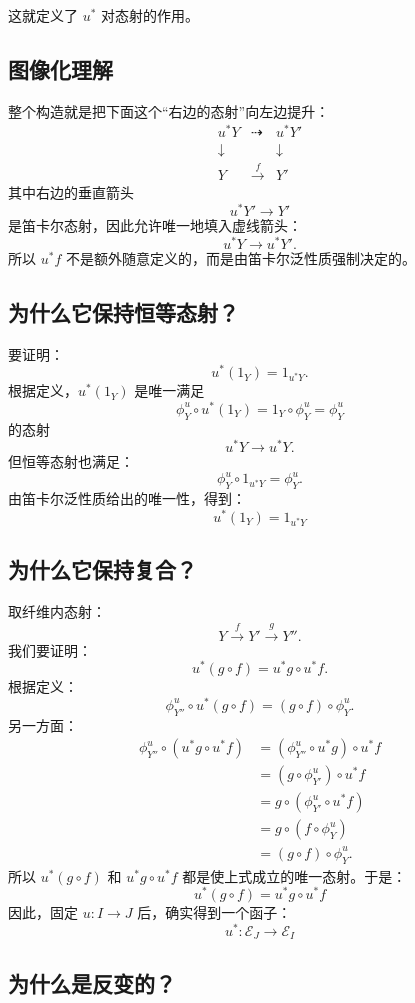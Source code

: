 \documentclass[12pt,a4paper]{article}
\begin{document}
这就定义了 \(u^*\) 对态射的作用。

\subsection{图像化理解}

整个构造就是把下面这个“右边的态射”向左边提升：
\[
\begin{array}{ccccc}
u^*Y & \dashrightarrow & u^*Y'\\
\downarrow && \downarrow\\
Y&\xrightarrow{f}&Y'
\end{array}
\]
其中右边的垂直箭头
\[
u^*Y'\to Y'
\]
是笛卡尔态射，因此允许唯一地填入虚线箭头：
\[
u^*Y\to u^*Y'.
\]
所以 \(u^*f\) 不是额外随意定义的，而是由笛卡尔泛性质强制决定的。

\subsection{为什么它保持恒等态射？}

要证明：
\[
u^*(1_Y)=1_{u^*Y}.
\]
根据定义，\(u^*(1_Y)\) 是唯一满足
\[
\phi_Y^u\circ u^*(1_Y)
=
1_Y\circ\phi_Y^u
=
\phi_Y^u
\]
的态射
\[
u^*Y\to u^*Y.
\]
但恒等态射也满足：
\[
\phi_Y^u\circ 1_{u^*Y}
=
\phi_Y^u.
\]
由笛卡尔泛性质给出的唯一性，得到：
\[
\boxed{
u^*(1_Y)=1_{u^*Y}
}
\]

\subsection{为什么它保持复合？}

取纤维内态射：
\[
Y\xrightarrow{f}Y'\xrightarrow{g}Y''.
\]
我们要证明：
\[
u^*(g\circ f)=u^*g\circ u^*f.
\]
根据定义：
\[
\phi_{Y''}^u\circ u^*(g\circ f)
=
(g\circ f)\circ\phi_Y^u.
\]
另一方面：
\begin{align*}
\phi_{Y''}^u\circ(u^*g\circ u^*f)
&=
(\phi_{Y''}^u\circ u^*g)\circ u^*f\\
&=
(g\circ\phi_{Y'}^u)\circ u^*f\\
&=
g\circ(\phi_{Y'}^u\circ u^*f)\\
&=
g\circ(f\circ\phi_Y^u)\\
&=
(g\circ f)\circ\phi_Y^u.
\end{align*}
所以 \(u^*(g\circ f)\) 和 \(u^*g\circ u^*f\) 都是使上式成立的唯一态射。于是：
\[
\boxed{
u^*(g\circ f)=u^*g\circ u^*f
}
\]
因此，固定 \(u:I\to J\) 后，确实得到一个函子：
\[
\boxed{
u^*:\mathcal{E}_J\to\mathcal{E}_I
}
\]

\subsection{为什么是反变的？}
\end{document}
